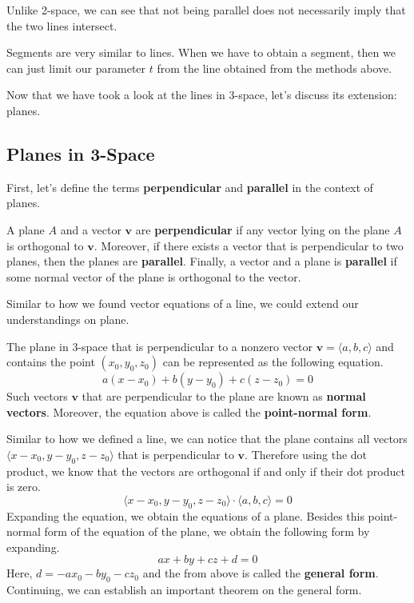 \documentclass[../../main.tex]{subfiles}
\begin{document}
Unlike 2-space, we can see that not being parallel does not
necessarily imply that the two lines intersect.

\begin{important}
Segments are very similar to lines. When we have to obtain a segment,
then we can just limit our parameter $t$ from the line obtained
from the methods above.
\end{important}

Now that we have took a look at the lines in 3-space, let's discuss
its extension: planes.

\subsection{Planes in 3-Space}

First, let's define the terms \textbf{perpendicular} and
\textbf{parallel} in the context of planes.

\begin{definition}{}{}
A plane $A$ and a vector $\mathbf{v}$ are \textbf{perpendicular}
if any vector lying on the plane $A$ is orthogonal to $\mathbf{v}$.
Moreover, if there exists a vector that is perpendicular to two
planes, then the planes are \textbf{parallel}. Finally, a vector
and a plane is \textbf{parallel} if some normal vector of the plane
is orthogonal to the vector.
\end{definition}

Similar to how we found vector equations of a line, we could
extend our understandings on plane.

\begin{important}{}{}
The plane in 3-space that is perpendicular to a nonzero vector
$\mathbf{v} = \langle a, b, c \rangle$ and contains the point
$(x_0, y_0, z_0)$ can be represented as the following equation.
\[
a(x - x_0) + b(y - y_0) + c(z - z_0) = 0
\]
Such vectors $\mathbf{v}$ that are perpendicular to the plane
are known as \textbf{normal vectors}. Moreover, the equation
above is called the \textbf{point-normal form}.
\end{important}

Similar to how we defined a line, we can notice that the plane
contains all vectors $\langle x - x_0, y - y_0, z - z_0 \rangle$
that is perpendicular to $\mathbf{v}$. Therefore using the dot
product, we know that the vectors are orthogonal if and only
if their dot product is zero.
\[
\langle x - x_0, y - y_0, z - z_0 \rangle \cdot
    \langle a, b, c \rangle
= 0
\]
Expanding the equation, we obtain the equations of a plane.
Besides this point-normal form of the equation of the plane,
we obtain the following form by expanding.
\[
ax + by + cz + d = 0
\]
Here, $d = -ax_0 - by_0 - cz_0$ and the from above is called
the \textbf{general form}. Continuing, we can establish an
important theorem on the general form.
\end{document}
